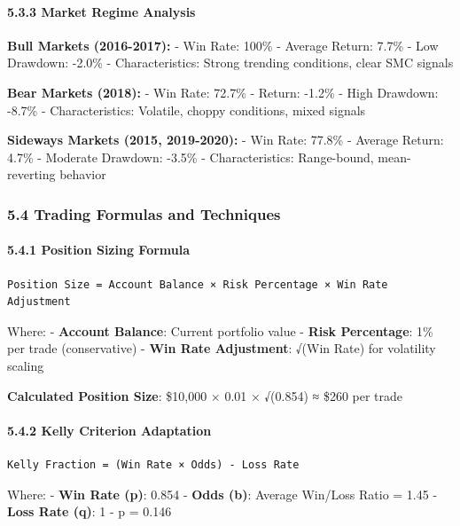 \paragraph{5.3.3 Market Regime Analysis}\label{market-regime-analysis}

\textbf{Bull Markets (2016-2017):} - Win Rate: 100\% - Average Return:
7.7\% - Low Drawdown: -2.0\% - Characteristics: Strong trending
conditions, clear SMC signals

\textbf{Bear Markets (2018):} - Win Rate: 72.7\% - Return: -1.2\% - High
Drawdown: -8.7\% - Characteristics: Volatile, choppy conditions, mixed
signals

\textbf{Sideways Markets (2015, 2019-2020):} - Win Rate: 77.8\% -
Average Return: 4.7\% - Moderate Drawdown: -3.5\% - Characteristics:
Range-bound, mean-reverting behavior

\subsubsection{5.4 Trading Formulas and
Techniques}\label{trading-formulas-and-techniques}

\paragraph{5.4.1 Position Sizing Formula}\label{position-sizing-formula}

\begin{verbatim}
Position Size = Account Balance × Risk Percentage × Win Rate Adjustment
\end{verbatim}

Where: - \textbf{Account Balance}: Current portfolio value -
\textbf{Risk Percentage}: 1\% per trade (conservative) - \textbf{Win
Rate Adjustment}: √(Win Rate) for volatility scaling

\textbf{Calculated Position Size}: \$10,000 × 0.01 × √(0.854) ≈ \$260
per trade

\paragraph{5.4.2 Kelly Criterion
Adaptation}\label{kelly-criterion-adaptation}

\begin{verbatim}
Kelly Fraction = (Win Rate × Odds) - Loss Rate
\end{verbatim}

Where: - \textbf{Win Rate (p)}: 0.854 - \textbf{Odds (b)}: Average
Win/Loss Ratio = 1.45 - \textbf{Loss Rate (q)}: 1 - p = 0.146

